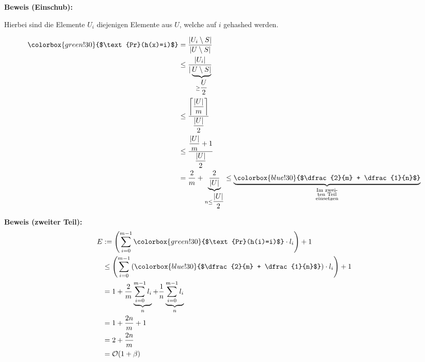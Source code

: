 \documentclass{scrartcl}%
\begin{document}
    \newpage
    \textbf{\textsf{Beweis (Einschub):}}
		
		Hierbei sind die Elemente $U_i$ diejenigen Elemente aus $U$, welche auf $i$ gehashed werden.
		
    \begin{equation*}
        \begin{flalign}
            \colorbox{green!30}{$\text{Pr}(h(x)=i)$} &= \dfrac{|U_i\setminus S|}{|U\setminus S|}\\\nonumber
            & \leq \dfrac{|U_i|}{|\underbrace{U\setminus S|}_{\geq \dfrac{U}{2}}}\\\nonumber
            &\leq \dfrac{\left\lceil\dfrac{|U|}{m}\right\rceil}{\dfrac{|U|}{2}}\\\nonumber
            &\leq \dfrac{\dfrac{|U|}{m} + 1}{\dfrac{|U|}{2}}\\\nonumber
            &= \dfrac{2}{m} + \underbrace{\dfrac{2}{|U|}}_{n \leq \dfrac{|U|}{2}} \leq \underbrace{\colorbox{blue!30}{$\dfrac{2}{m} + \dfrac{1}{n}$}}_{\substack{\text{Im zwei-} \\ \text{ten Teil} \\ \text{einsetzen}}}
        \end{flalign}
    \end{equation*}

    \vspace*{0.3cm}
    \textbf{\textsf{Beweis (zweiter Teil):}}
    \begin{equation*}
        \begin{flalign}
            E & :=\left(\sum_{i=0}^{m-1}\colorbox{green!30}{$\text{Pr}(h(i)=i)$} \cdot l_i\right) + 1 \\\nonumber
            & \leq \left(\sum_{i=0}^{m-1}\left(\colorbox{blue!30}{$\dfrac{2}{m} + \dfrac{1}{n}$}\right) \cdot l_i\right) + 1 \\\nonumber
            & =  1 + \frac{2}{m} \underbrace{\sum_{i=0}^{m-1}l_i}_{n} + \frac{1}{n} \underbrace{\sum_{i=0}^{m-1}l_i}_{n} \\\nonumber
            & =  1 + \frac{2n}{m} +1 \\\nonumber
            & = 2 + \frac{2n}{m} \\\nonumber
            & = \mathcal{O}(1+\beta)
        \end{flalign}
    \end{equation*}
    \proofend
\end{document}
